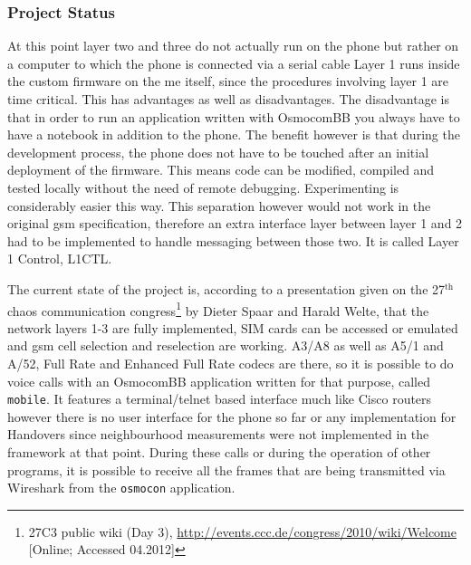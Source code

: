 \subsubsection{Project Status}
At this point layer two and three do not actually run on the phone but rather on a computer to which the phone is connected via a serial cable
Layer 1 runs inside the custom firmware on the \gls{me} itself, since the procedures involving layer 1 are time critical.
This has advantages as well as disadvantages.
The disadvantage is that in order to run an application written with OsmocomBB you always have to have a notebook in addition to the phone.
The benefit however is that during the development process, the phone does not have to be touched after an initial deployment of the firmware.
This means code can be modified, compiled and tested locally without the need of remote debugging.
Experimenting is considerably easier this way.
This separation however would not work in the original \gls{gsm} specification, therefore an extra interface layer between layer 1 and 2 had to be implemented to handle messaging between those two.
It is called Layer 1 Control, L1CTL.

The current state of the project is, according to a presentation given on the 27$^\text{th}$ chaos communication congress\footnote{27C3 public wiki (Day 3), \url{http://events.ccc.de/congress/2010/wiki/Welcome} [Online; Accessed 04.2012]} by Dieter Spaar and Harald Welte, that the network layers 1-3 are fully implemented, SIM cards can be accessed or emulated and \gls{gsm} cell selection and reselection are working.
A3/A8 as well as A5/1 and A/52, Full Rate and Enhanced Full Rate codecs are there, so it is possible to do voice calls with an OsmocomBB application written for that purpose, called \texttt{mobile}.
It features a terminal/telnet based interface much like Cisco routers however there is no user interface for the phone so far or any implementation for Handovers since neighbourhood measurements were not implemented in the framework at that point.
During these calls or during the operation of other programs, it is possible to receive all the frames that are being transmitted via Wireshark from the \texttt{osmocon} application.

